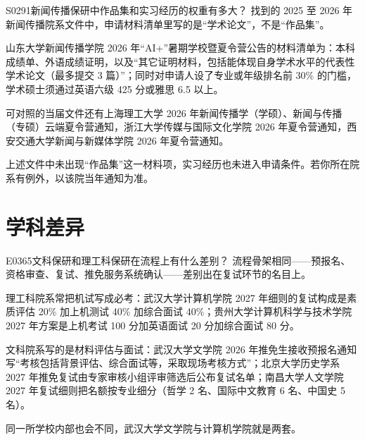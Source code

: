\begin{qa}{S0291}{新闻传播保研中作品集和实习经历的权重有多大？}
找到的 2025 至 2026 年新闻传播院系文件中，申请材料清单里写的是“学术论文”，不是“作品集”。

山东大学新闻传播学院 2026 年“AI+”暑期学校暨夏令营公告的材料清单为：本科成绩单、外语成绩证明，以及“其它证明材料，包括能体现自身学术水平的代表性学术论文（最多提交 3 篇）”；同时对申请人设了专业或年级排名前 30\% 的门槛，学术硕士须通过英语六级 425 分或雅思 6.5 以上。

可对照的当届文件还有上海理工大学 2026 年新闻传播学（学硕）、新闻与传播（专硕）云端夏令营通知，浙江大学传媒与国际文化学院 2026 年夏令营通知，西安交通大学新闻与新媒体学院 2026 年夏令营通知。

上述文件中未出现“作品集”这一材料项，实习经历也未进入申请条件。若你所在院系有例外，以该院当年通知为准。
\end{qa}

\section{学科差异}
\begin{qa}{E0365}{文科保研和理工科保研在流程上有什么差别？}
流程骨架相同——预报名、资格审查、复试、推免服务系统确认——差别出在复试环节的名目上。

理工科院系常把机试写成必考：武汉大学计算机学院 2027 年细则的复试构成是素质评估 20\% 加上机测试 40\% 加综合面试 40\%；贵州大学计算机科学与技术学院 2027 年方案是上机考试 100 分加英语面试 20 分加综合面试 80 分。

文科院系写的是材料评估与面试：武汉大学文学院 2026 年推免生接收预报名通知写“考核包括背景评估、综合面试等，采取现场考核方式”；北京大学历史学系 2027 年推免复试由专家审核小组评审筛选后公布复试名单；南昌大学人文学院 2027 年复试细则把名额按专业细分（哲学 2 名、国际中文教育 6 名、中国史 5 名）。

同一所学校内部也会不同，武汉大学文学院与计算机学院就是两套。
\end{qa}

